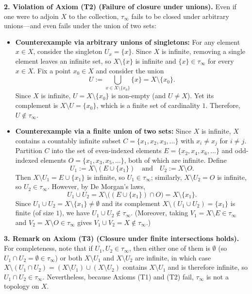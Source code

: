 \textbf{2. Violation of Axiom (T2) (Failure of closure under unions).} Even if one were to
adjoin $X$ to the collection, $\tau_\infty$ fails to be closed under arbitrary unions---and
even fails under the union of two sets:
\begin{itemize}
  \item \textbf{Counterexample via arbitrary unions of singletons:} For any element $x\in X$,
        consider the singleton $U_x=\{x\}$. Since $X$ is infinite, removing a single element
        leaves an infinite set, so $X\setminus\{x\}$ is infinite and $\{x\}\in\tau_\infty$
        for every $x\in X$. Fix a point $x_0\in X$ and consider the union
        \[ U:=\bigcup_{x\in X\setminus\{x_0\}}\{x\}=X\setminus\{x_0\}. \]
        Since $X$ is infinite, $U=X\setminus\{x_0\}$ is non-empty (and $U\neq X$). Yet its
        complement is $X\setminus U=\{x_0\}$, which is a finite set of cardinality $1$.
        Therefore, $U\notin\tau_\infty$.
  \item \textbf{Counterexample via a finite union of two sets:} Since $X$ is infinite, $X$
        contains a countably infinite subset $C=\{x_1,x_2,x_3,\dots\}$ with $x_i\neq x_j$ for
        $i\neq j$. Partition $C$ into the set of even-indexed elements
        $E=\{x_2,x_4,x_6,\dots\}$ and odd-indexed elements $O=\{x_1,x_3,x_5,\dots\}$, both of
        which are infinite. Define
        \[ U_1:=X\setminus(E\cup\{x_1\})\quad\text{and}\quad U_2:=X\setminus O. \]
        Then $X\setminus U_1=E\cup\{x_1\}$ is infinite, so $U_1\in\tau_\infty$; similarly,
        $X\setminus U_2=O$ is infinite, so $U_2\in\tau_\infty$. However, by De Morgan's laws,
        \[ U_1\cup U_2=X\setminus\big((E\cup\{x_1\})\cap O\big)=X\setminus\{x_1\}. \]
        Since $U_1\cup U_2=X\setminus\{x_1\}\neq\emptyset$ and its complement
        $X\setminus(U_1\cup U_2)=\{x_1\}$ is finite (of size $1$), we have
        $U_1\cup U_2\notin\tau_\infty$. (Moreover, taking $V_1=X\setminus E\in\tau_\infty$ and
        $V_2=X\setminus O\in\tau_\infty$ gives $V_1\cup V_2=X\notin\tau_\infty$.)
\end{itemize}

\textbf{3. Remark on Axiom (T3) (Closure under finite intersections holds).} For completeness,
note that if $U_1,U_2\in\tau_\infty$, then either one of them is $\emptyset$ (so
$U_1\cap U_2=\emptyset\in\tau_\infty$) or both $X\setminus U_1$ and $X\setminus U_2$ are
infinite, in which case $X\setminus(U_1\cap U_2)=(X\setminus U_1)\cup(X\setminus U_2)$ contains
$X\setminus U_1$ and is therefore infinite, so $U_1\cap U_2\in\tau_\infty$. Nevertheless,
because Axioms (T1) and (T2) fail, $\tau_\infty$ is not a topology on $X$.
